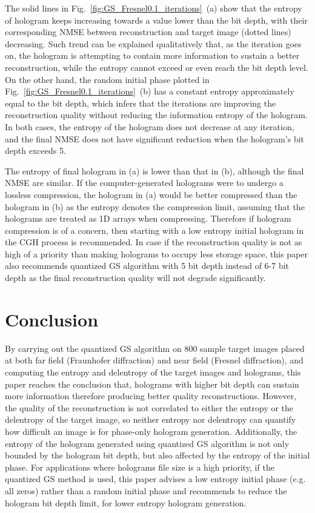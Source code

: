 	The solid lines in Fig.~\ref{fig:GS_Fresnel0.1_iterations}~(a) show that the entropy of hologram keeps increasing towards a value lower than the bit depth, with their corresponding NMSE between reconstruction and target image (dotted lines) decreasing. Such trend can be explained qualitatively that, as the iteration goes on, the hologram is attempting to contain more information to sustain a better reconstruction, while the entropy cannot exceed or even reach the bit depth level. On the other hand, the random initial phase plotted in Fig.~\ref{fig:GS_Fresnel0.1_iterations}~(b) has a constant entropy approximately equal to the bit depth, which infers that the iterations are improving the reconstruction quality without reducing the information entropy of the hologram. In both cases, the entropy of the hologram does not decrease at any iteration, and the final NMSE does not have significant reduction when the hologram's bit depth exceeds 5.

	The entropy of final hologram in (a) is lower than that in (b), although the final NMSE are similar. If the computer-generated holograms were to undergo a lossless compression, the hologram in (a) would be better compressed than the hologram in (b) as the entropy denotes the compression limit, assuming that the holograms are treated as 1D arrays when compressing. Therefore if hologram compression is of a concern, then starting with a low entropy initial hologram in the CGH process is recommended. In case if the reconstruction quality is not as high of a priority than making holograms to occupy less storage space, this paper also recommends quantized GS algorithm with 5 bit depth instead of 6-7 bit depth as the final reconstruction quality will not degrade significantly.



\section{Conclusion}
	By carrying out the quantized GS algorithm on 800 sample target images placed at both far field (Fraunhofer diffraction) and near field (Fresnel diffraction), and computing the entropy and delentropy of the target images and holograms, this paper reaches the conclusion that, holograms with higher bit depth can sustain more information therefore producing better quality reconstructions. However, the quality of the reconstruction is not correlated to either the entropy or the delentropy of the target image, so neither entropy nor delentropy can quantify how difficult an image is for phase-only hologram generation. Additionally, the entropy of the hologram generated using quantized GS algorithm is not only bounded by the hologram bit depth, but also affected by the entropy of the initial phase. For applications where holograms file size is a high priority, if the quantized GS method is used, this paper advises a low entropy initial phase (e.g. all zeros) rather than a random initial phase and recommends to reduce the hologram bit depth limit, for lower entropy hologram generation.
